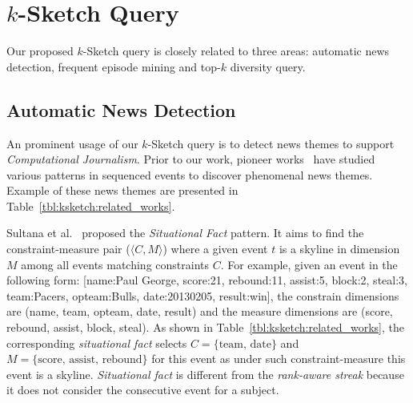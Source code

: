 \section{$k$-Sketch Query}\label{sec:related_work:sketch}
Our proposed $k$-Sketch query is closely related
to three areas: automatic news detection, frequent episode mining and top-$k$ diversity query.

\subsection{Automatic News Detection}
An prominent usage of our $k$-Sketch query is to detect
news themes to support \emph{Computational Journalism}.
Prior to our work,
pioneer works~\cite{sultana2014incremental,wu2012one,zhang2014discovering} have studied various patterns in sequenced events
to discover phenomenal news themes. Example of these news themes
are presented in Table~\ref{tbl:ksketch:related_works}.

Sultana et al.~\cite{sultana2014incremental} proposed the \emph{Situational Fact} pattern. It
aims to find the constraint-measure pair ($\langle C,M \rangle$) where a given event $t$ is a skyline in dimension $M$
among all events matching constraints $C$.
For example, given an event in the following form: [name:Paul George, score:21, rebound:11, assist:5, block:2, steal:3, team:Pacers, opteam:Bulls, date:20130205, result:win], the constrain dimensions are (name, team, opteam, date, result)
and the measure dimensions are (score, rebound, assist, block, steal). As shown in Table~\ref{tbl:ksketch:related_works}, the corresponding \emph{situational fact} selects $C=\{\text{team, date}\}$ and $M=\{\text{score, assist, rebound}\}$ for this event as under such constraint-measure this event is a skyline. \emph{Situational fact} is different from the \emph{rank-aware streak} because it does not consider the consecutive event for a subject.

